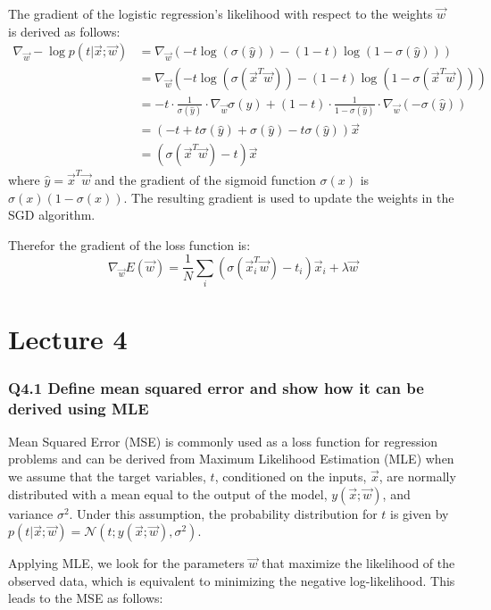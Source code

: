 \documentclass[11pt]{article}
\begin{document}
The gradient of the logistic regression's likelihood with respect to the weights $\vec{w}$ is derived as follows:
\begin{align*}
\nabla_{\vec{w}} -\log p(t|\vec{x}; \vec{w}) &= \nabla_{\vec{w}} \left( -t \log (\sigma(\hat{y})) - (1-t) \log (1 - \sigma(\hat{y})) \right) \\
&= \nabla_{\vec{w}} \left( -t \log (\sigma(\vec{x}^T \vec{w})) - (1-t) \log (1 - \sigma(\vec{x}^T \vec{w})) \right) \\
&= -t \cdot \frac{1}{\sigma(\hat{y})} \cdot \nabla_{\vec{w}} \sigma(\hat{y}) + (1-t) \cdot \frac{1}{1 - \sigma(\hat{y})} \cdot \nabla_{\vec{w}} (-\sigma(\hat{y})) \\
&= \left( -t + t \sigma(\hat{y}) + \sigma(\hat{y}) - t \sigma(\hat{y}) \right) \vec{x} \\
&= \left( \sigma(\vec{x}^T \vec{w}) - t \right) \vec{x}
\end{align*}
where $\hat{y} = \vec{x}^T \vec{w}$ and the gradient of the sigmoid function $\sigma(x)$ is $\sigma(x)(1 - \sigma(x))$. The resulting gradient is used to update the weights in the SGD algorithm.

Therefor the gradient of the loss function is:
\[
\nabla_{\vec{w}} E(\vec{w}) = \frac{1}{N} \sum_{i} \left( \sigma(\vec{x}_i^T \vec{w}) - t_i \right) \vec{x}_i + \lambda \vec{w}
\]


\part{Lecture 4}
\section{Q4.1 Define mean squared error and show how it can be derived using MLE}

Mean Squared Error (MSE) is commonly used as a loss function for regression problems and can be derived from Maximum Likelihood Estimation (MLE) when we assume that the target variables, \( t \), conditioned on the inputs, \( \vec{x} \), are normally distributed with a mean equal to the output of the model, \( y(\vec{x}; \vec{w}) \), and variance \( \sigma^2 \). Under this assumption, the probability distribution for \( t \) is given by \( p(t|\vec{x}; \vec{w}) = \mathcal{N}(t; y(\vec{x}; \vec{w}), \sigma^2) \).

Applying MLE, we look for the parameters \( \vec{w} \) that maximize the likelihood of the observed data, which is equivalent to minimizing the negative log-likelihood. This leads to the MSE as follows:
\end{document}
